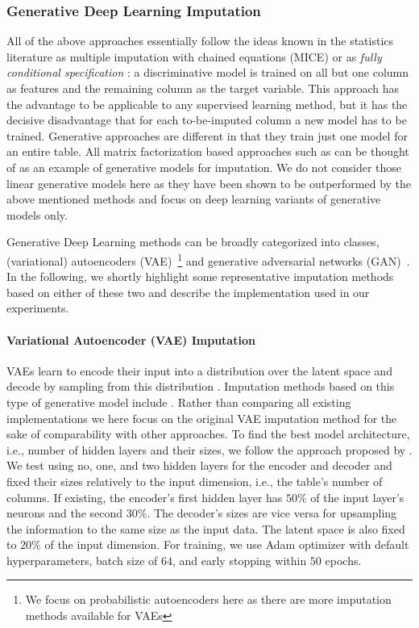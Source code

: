 \subsubsection{Generative Deep Learning Imputation}
\label{sec:generative_imputation}
%
All of the above approaches essentially follow the ideas known in the statistics literature as multiple imputation with chained equations (MICE) \citep{Little} or as {\em fully conditional specification} \citep{vanBuuren2018}: a discriminative model is trained on all but one column as features and the remaining column as the target variable. This approach has the advantage to be applicable to any supervised learning method, but it has the decisive disadvantage that for each to-be-imputed column a new model has to be trained. Generative approaches are different in that they train just one model for an entire table. All matrix factorization based approaches such as \citep{Troyanskaya2001,Koren2009,Mazumder2010} can be thought of as an example of generative models for imputation. We do not consider those linear generative models here as they have been shown to be outperformed by the above mentioned methods and focus on deep learning variants of generative models only.

Generative Deep Learning methods can be broadly categorized into classes, (variational) autoencoders (VAE)~\citep{VAE}\footnote{We focus on probabilistic autoencoders here as there are more imputation methods available for VAEs} and generative adversarial networks (GAN)~\citep{GAN}. In the following, we shortly highlight some representative imputation methods based on either of these two and describe the implementation used in our experiments.

\paragraph{Variational Autoencoder (VAE) Imputation}
%
VAEs learn to encode their input into a distribution over the latent space and decode by sampling from this distribution \citep{VAE}. Imputation methods based on this type of generative model include \cite{HIVAE, VAE_for_genomic_data, VAEM}. Rather than comparing all existing implementations we here focus on the original VAE imputation method for the sake of comparability with other approaches. To find the best model architecture, i.e., number of hidden layers and their sizes, we follow the approach proposed by \cite{CaminoVAE}. We test using no, one, and two hidden layers for the encoder and decoder and fixed their sizes relatively to the input dimension, i.e., the table's number of columns. If existing, the encoder's first hidden layer has $50\%$ of the input layer's neurons and the second $30\%$. The decoder's sizes are vice versa for upsampling the information to the same size as the input data. The latent space is also fixed to $20\%$ of the input dimension.
For training, we use Adam optimizer with default hyperparameters, batch size of $64$, and early stopping within $50$ epochs.

